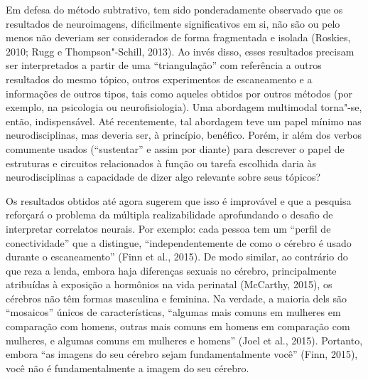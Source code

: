 Em defesa do método subtrativo, tem sido ponderadamente observado que os
resultados de neuroimagens, dificilmente significativos em si, não são
ou pelo menos não deveriam ser considerados de forma fragmentada e
isolada (Roskies, 2010; Rugg e Thompson"-Schill, 2013). Ao invés disso,
esses resultados precisam ser interpretados a partir de uma
``triangulação'' com referência a outros resultados do mesmo tópico,
outros experimentos de escaneamento e a informações de outros tipos,
tais como aqueles obtidos por outros métodos (por exemplo, na psicologia
ou neurofisiologia). Uma abordagem multimodal torna"-se, então,
indispensável. Até recentemente, tal abordagem teve um papel mínimo nas
neurodisciplinas, mas deveria ser, à princípio, benéfico. Porém, ir além
dos verbos comumente usados (``sustentar'' e assim por diante) para
descrever o papel de estruturas e circuitos relacionados à função ou
tarefa escolhida daria às neurodisciplinas a capacidade de dizer algo
relevante sobre seus tópicos?

Os resultados obtidos até agora sugerem que isso é improvável e que a
pesquisa reforçará o problema da múltipla realizabilidade aprofundando o
desafio de interpretar correlatos neurais. Por exemplo: cada pessoa tem
um ``perfil de conectividade'' que a distingue, ``independentemente de
como o cérebro é usado durante o escaneamento'' (Finn et al., 2015). De
modo similar, ao contrário do que reza a lenda, embora haja diferenças
sexuais no cérebro, principalmente atribuídas à exposição a hormônios na
vida perinatal (McCarthy, 2015), os cérebros não têm formas masculina e
feminina. Na verdade, a maioria dels são ``mosaicos'' únicos de
características, ``algumas mais comuns em mulheres em comparação com
homens, outras mais comuns em homens em comparação com mulheres, e
algumas comuns em mulheres e homens'' (Joel et al., 2015). Portanto,
embora ``as imagens do seu cérebro sejam fundamentalmente você'' (Finn,
2015), você não é fundamentalmente a imagem do seu cérebro.

